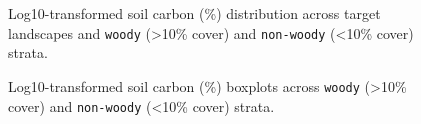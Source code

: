 \documentclass[
  letterpaper,
  DIV=11,
  numbers=noendperiod]{scrartcl}
\begin{document}
\begin{figure}


\caption{\label{fig-log10soc-dist}Log10-transformed soil carbon (\%)
distribution across target landscapes and \texttt{woody}
(\textgreater10\% cover) and \texttt{non-woody} (\textless10\% cover)
strata.}

\end{figure}%

\begin{figure}


\caption{\label{fig-log10soc-boxplots}Log10-transformed soil carbon (\%)
boxplots across \texttt{woody} (\textgreater10\% cover) and
\texttt{non-woody} (\textless10\% cover) strata.}

\end{figure}%
\end{document}
